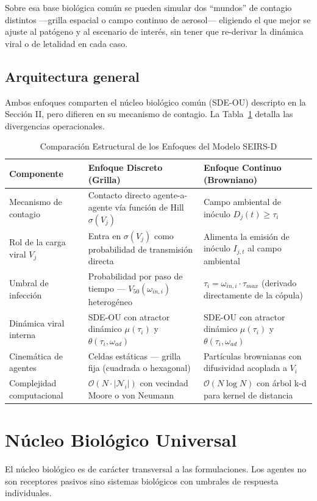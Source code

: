 \documentclass[conference]{IEEEtran}
\begin{document}
Sobre esa base biológica común se pueden simular dos ``mundos'' de contagio distintos ---grilla espacial o campo continuo de aerosol--- eligiendo el que mejor se ajuste al patógeno y al escenario de interés, sin tener que re-derivar la dinámica viral o de letalidad en cada caso.

\subsection{Arquitectura general}
Ambos enfoques comparten el núcleo biológico común (SDE-OU) descripto en la Sección II, pero difieren en su mecanismo de contagio. La Tabla~\ref{tab:arquitectura} detalla las divergencias operacionales.

\begin{table}[!t]
\renewcommand{\arraystretch}{1.3}
\caption{Comparación Estructural de los Enfoques del Modelo SEIRS-D}
\label{tab:arquitectura}
\centering
\begin{tabular}{lll}
\hline
\textbf{Componente} & \textbf{Enfoque Discreto (Grilla)} & \textbf{Enfoque Continuo (Browniano)} \\
\hline
Mecanismo de contagio & Contacto directo agente-a-agente vía función de Hill $\sigma(V_j)$ & Campo ambiental de inóculo $D_j(t) \geq \tau_i$ \\
Rol de la carga viral $V_j$ & Entra en $\sigma(V_j)$ como probabilidad de transmisión directa & Alimenta la emisión de inóculo $I_{j,t}$ al campo ambiental \\
Umbral de infección & Probabilidad por paso de tiempo --- $V_{50}(\omega_{in,i})$ heterogéneo & $\tau_i = \omega_{in,i} \cdot \tau_{max}$ (derivado directamente de la cópula) \\
Dinámica viral interna & SDE-OU con atractor dinámico $\mu(\tau_i)$ y $\theta(\tau_i, \omega_{ad})$ & SDE-OU con atractor dinámico $\mu(\tau_i)$ y $\theta(\tau_i, \omega_{ad})$ \\
Cinemática de agentes & Celdas estáticas --- grilla fija (cuadrada o hexagonal) & Partículas brownianas con difusividad acoplada a $V_i$ \\
Complejidad computacional & $\mathcal{O}(N \cdot |\mathcal{N}_i|)$ con vecindad Moore o von Neumann & $\mathcal{O}(N \log N)$ con árbol k-d para kernel de distancia \\
\hline
\end{tabular}
\end{table}

\section{Núcleo Biológico Universal}
El núcleo biológico es de carácter transversal a las formulaciones. Los agentes no son receptores pasivos sino sistemas biológicos con umbrales de respuesta individuales.
\end{document}
